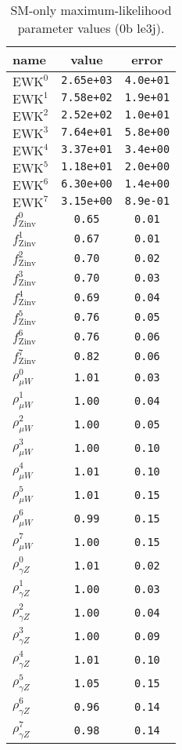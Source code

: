 \documentclass{article}
\begin{document}
\begin{table}\centering
\caption{SM-only maximum-likelihood parameter values (0b le3j).}
\label{tab:mlParameterValues0b_le3j}
\begin{tabular}{lcc}name & value & error \\ \hline
$\mathrm{EWK}^{0}$ & {\tt  2.65e+03} & {\tt  4.0e+01}\\
$\mathrm{EWK}^{1}$ & {\tt  7.58e+02} & {\tt  1.9e+01}\\
$\mathrm{EWK}^{2}$ & {\tt  2.52e+02} & {\tt  1.0e+01}\\
$\mathrm{EWK}^{3}$ & {\tt  7.64e+01} & {\tt  5.8e+00}\\
$\mathrm{EWK}^{4}$ & {\tt  3.37e+01} & {\tt  3.4e+00}\\
$\mathrm{EWK}^{5}$ & {\tt  1.18e+01} & {\tt  2.0e+00}\\
$\mathrm{EWK}^{6}$ & {\tt  6.30e+00} & {\tt  1.4e+00}\\
$\mathrm{EWK}^{7}$ & {\tt  3.15e+00} & {\tt  8.9e-01}\\
$f_\mathrm{Zinv}^{0}$ & {\tt 0.65} & {\tt 0.01}\\
$f_\mathrm{Zinv}^{1}$ & {\tt 0.67} & {\tt 0.01}\\
$f_\mathrm{Zinv}^{2}$ & {\tt 0.70} & {\tt 0.02}\\
$f_\mathrm{Zinv}^{3}$ & {\tt 0.70} & {\tt 0.03}\\
$f_\mathrm{Zinv}^{4}$ & {\tt 0.69} & {\tt 0.04}\\
$f_\mathrm{Zinv}^{5}$ & {\tt 0.76} & {\tt 0.05}\\
$f_\mathrm{Zinv}^{6}$ & {\tt 0.76} & {\tt 0.06}\\
$f_\mathrm{Zinv}^{7}$ & {\tt 0.82} & {\tt 0.06}\\
$\rho_{\mu W}^{0}$ & {\tt 1.01} & {\tt 0.03}\\
$\rho_{\mu W}^{1}$ & {\tt 1.00} & {\tt 0.04}\\
$\rho_{\mu W}^{2}$ & {\tt 1.00} & {\tt 0.05}\\
$\rho_{\mu W}^{3}$ & {\tt 1.00} & {\tt 0.10}\\
$\rho_{\mu W}^{4}$ & {\tt 1.01} & {\tt 0.10}\\
$\rho_{\mu W}^{5}$ & {\tt 1.01} & {\tt 0.15}\\
$\rho_{\mu W}^{6}$ & {\tt 0.99} & {\tt 0.15}\\
$\rho_{\mu W}^{7}$ & {\tt 1.00} & {\tt 0.15}\\
$\rho_{\gamma Z}^{0}$ & {\tt 1.01} & {\tt 0.02}\\
$\rho_{\gamma Z}^{1}$ & {\tt 1.00} & {\tt 0.03}\\
$\rho_{\gamma Z}^{2}$ & {\tt 1.00} & {\tt 0.04}\\
$\rho_{\gamma Z}^{3}$ & {\tt 1.00} & {\tt 0.09}\\
$\rho_{\gamma Z}^{4}$ & {\tt 1.01} & {\tt 0.10}\\
$\rho_{\gamma Z}^{5}$ & {\tt 1.05} & {\tt 0.15}\\
$\rho_{\gamma Z}^{6}$ & {\tt 0.96} & {\tt 0.14}\\
$\rho_{\gamma Z}^{7}$ & {\tt 0.98} & {\tt 0.14}\\
\hline
\end{tabular}
\end{table}
\end{document}
